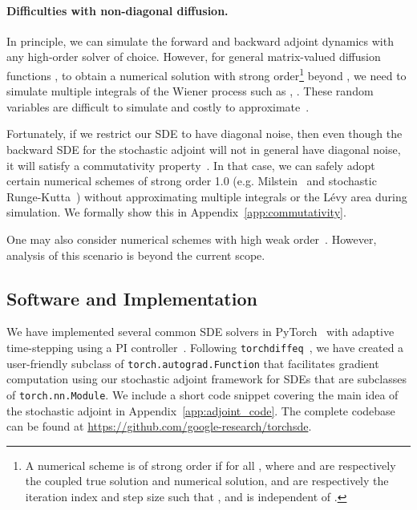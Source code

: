 \documentclass[twoside]{article}
\begin{document}
\paragraph{Difficulties with non-diagonal diffusion.}
In principle, we can simulate the forward and backward adjoint dynamics with any high-order solver of choice. However, for general matrix-valued diffusion functions , to obtain a numerical solution with strong order\footnote{A numerical scheme is of strong order  if  for all , where  and  are respectively the coupled true solution and numerical solution,  and  are respectively the iteration index and step size such that , and  is independent of .} beyond , we need to simulate multiple integrals of the Wiener process such as , .
These random variables are difficult to simulate and costly to approximate~\cite{wiktorsson2001joint}.

Fortunately, if we restrict our SDE to have diagonal noise, then even though the backward SDE for the stochastic adjoint will not in general have diagonal noise, it will satisfy a commutativity property~\cite{rossler2004runge}.
In that case, we can safely adopt certain numerical schemes of strong order 1.0 (e.g. Milstein~\cite{milstein1994numerical} and stochastic Runge-Kutta~\cite{rossler2010runge}) without approximating multiple integrals or the L\'evy area during simulation. 
We formally show this in Appendix~\ref{app:commutativity}.

One may also consider numerical schemes with high weak order~\cite{kloeden2013numerical}. 
However, analysis of this scenario is beyond the current scope.

\subsection{Software and Implementation}
We have implemented several common SDE solvers in PyTorch~\cite{paszke2017automatic} with adaptive time-stepping using a PI controller~\cite{burrage2004adaptive,ilie2015adaptive}. 
Following \texttt{torchdiffeq}~\cite{chen2018neural}, we have created a user-friendly subclass of \texttt{torch.autograd.Function} that facilitates gradient computation using our stochastic adjoint framework for SDEs that are subclasses of \texttt{torch.nn.Module}. 
We include a short code snippet covering the main idea of the stochastic adjoint in Appendix~\ref{app:adjoint_code}.
The complete codebase can be found at \url{https://github.com/google-research/torchsde}.
\end{document}

